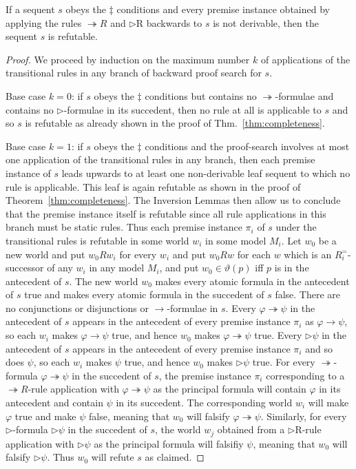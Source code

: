 \documentclass[envcountsect,envcountsame]{llncs}
\newcommand{\iimp}{\twoheadrightarrow}
\newcommand{\limp}{\rightarrow}
\newcommand{\nxt}{\rhd}
\newcommand{\releq}{R^{=}}
\newcommand{\newbranchingsteprulename}{\iimp R}
\newcommand{\nxtrightrulename}{\nxt\mathrm{R}}
\begin{document}
\begin{lemma}\label{lemma:existential-inversion}
If a sequent $s$
obeys the $\ddagger$ conditions and every premise instance obtained by
applying the rules $\newbranchingsteprulename$ and $\nxtrightrulename$
backwards to $s$ is not derivable, then the sequent $s$ is refutable.
\end{lemma}
\begin{proof}
  We proceed by induction on the maximum number $k$ of applications of the
  transitional rules in any branch of backward proof search for $s$.

  Base case $k=0$: if $s$ obeys the $\ddagger$ conditions but contains no
  $\iimp$-formulae and contains no $\nxt$-formulae in its succedent,
  then no rule at all is applicable to $s$ and so $s$ is
  refutable as already shown in the proof of
  Thm.~\ref{thm:completeness}.

  Base case $k=1$: if $s$ obeys the $\ddagger$ conditions and the proof-search involves
  at most one application of the transitional rules in any branch,
  then each premise instance of $s$ leads upwards to at least one
  non-derivable leaf sequent to which no rule is applicable. This leaf
  is again refutable as shown in the proof of
  Theorem~\ref{thm:completeness}. The Inversion Lemmas then allow us
  to conclude that the premise instance itself is refutable since all
  rule applications in this branch must be static rules.
Thus each
  premise instance $\pi_i$ of $s$ under the transitional rules is
  refutable in some world $w_i$ in some model $M_i$. Let $w_0$ be a
  new world and put $w_0 R w_i$ for every $w_i$ and put $w_0 R w$ for
  each $w$ which is an $\releq_i$-successor of any $w_i$ in any model
  $M_i$, and put $w_0 \in \vartheta(p)$ iff $p$ is in the antecedent
  of $s$. The new world $w_0$ makes every atomic formula in the antecedent
  of $s$ true and makes every atomic formula in the succedent of $s$
  false.  There are no conjunctions or disjunctions or $\limp$-formulae in
  $s$. 
Every $\varphi\iimp\psi$ in the antecedent of $s$ appears in the
  antecedent of every premise instance $\pi_i$ as $\varphi\limp\psi$, so each
  $w_i$ makes $\varphi\limp\psi$ true, and hence $w_0$ makes
  $\varphi\iimp\psi$ true.
Every $\nxt\psi$ in the antecedent of $s$ appears in the
  antecedent of every premise instance $\pi_i$ and so does $\psi$, so
  each $w_i$ makes  $\psi$ true, and hence $w_0$ makes 
  $\nxt\psi$ true.
For every $\iimp$-formula $\varphi\iimp\psi$ in
  the succedent of $s$, the premise instance $\pi_i$ corresponding to a
  $\newbranchingsteprulename$-rule application with $\varphi\iimp\psi$
  as the principal formula will contain $\varphi$ in its antecedent 
  and contain $\psi$ in its succedent. The corresponding world $w_i$
  will make $\varphi$ true and make $\psi$
  false, meaning that $w_0$ will falsify $\varphi\iimp\psi$.
  Similarly, for every $\nxt$-formula $\nxt\psi$ in the succedent of
  $s$, the world $w_j$ obtained from a $\nxtrightrulename$-rule
  application with $\nxt\psi$ as the principal formula will falsifiy
  $\psi$, meaning that $w_0$ will falsify $\nxt\psi$. Thus $w_0$ will
  refute $s$ as claimed.


\end{proof}
\end{document}
